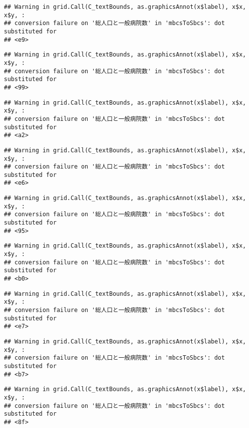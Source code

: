 \documentclass[
]{article}
\begin{document}
\begin{verbatim}
## Warning in grid.Call(C_textBounds, as.graphicsAnnot(x$label), x$x, x$y, :
## conversion failure on '総人口と一般病院数' in 'mbcsToSbcs': dot substituted for
## <e9>
\end{verbatim}

\begin{verbatim}
## Warning in grid.Call(C_textBounds, as.graphicsAnnot(x$label), x$x, x$y, :
## conversion failure on '総人口と一般病院数' in 'mbcsToSbcs': dot substituted for
## <99>
\end{verbatim}

\begin{verbatim}
## Warning in grid.Call(C_textBounds, as.graphicsAnnot(x$label), x$x, x$y, :
## conversion failure on '総人口と一般病院数' in 'mbcsToSbcs': dot substituted for
## <a2>
\end{verbatim}

\begin{verbatim}
## Warning in grid.Call(C_textBounds, as.graphicsAnnot(x$label), x$x, x$y, :
## conversion failure on '総人口と一般病院数' in 'mbcsToSbcs': dot substituted for
## <e6>
\end{verbatim}

\begin{verbatim}
## Warning in grid.Call(C_textBounds, as.graphicsAnnot(x$label), x$x, x$y, :
## conversion failure on '総人口と一般病院数' in 'mbcsToSbcs': dot substituted for
## <95>
\end{verbatim}

\begin{verbatim}
## Warning in grid.Call(C_textBounds, as.graphicsAnnot(x$label), x$x, x$y, :
## conversion failure on '総人口と一般病院数' in 'mbcsToSbcs': dot substituted for
## <b0>
\end{verbatim}

\begin{verbatim}
## Warning in grid.Call(C_textBounds, as.graphicsAnnot(x$label), x$x, x$y, :
## conversion failure on '総人口と一般病院数' in 'mbcsToSbcs': dot substituted for
## <e7>
\end{verbatim}

\begin{verbatim}
## Warning in grid.Call(C_textBounds, as.graphicsAnnot(x$label), x$x, x$y, :
## conversion failure on '総人口と一般病院数' in 'mbcsToSbcs': dot substituted for
## <b7>
\end{verbatim}

\begin{verbatim}
## Warning in grid.Call(C_textBounds, as.graphicsAnnot(x$label), x$x, x$y, :
## conversion failure on '総人口と一般病院数' in 'mbcsToSbcs': dot substituted for
## <8f>
\end{verbatim}
\end{document}
